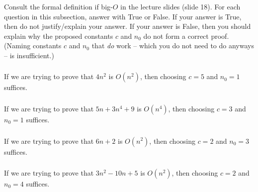 \documentclass{article}
\begin{document}
Consult the formal definition if big-$O$ in the lecture slides (slide 18). For each question in this subsection, answer with True or False. If your answer is True, then do not justify/explain your answer. If your answer is False, then you should explain why the proposed constants $c$ and $n_0$ do not form a correct proof. (Naming constants $c$ and $n_0$ that \textit{do} work -- which you do not need to do anyways -- is insufficient.)

\subsubsection{}

If we are trying to prove that $4n^2$ is $O(n^2)$, then choosing $c = 5$ and $n_0 = 1$ suffices.

\begin{mdframed}
\vspace{3em}
\end{mdframed}

\subsubsection{}

If we are trying to prove that $5n + 3n^4 + 9$ is $O(n^4)$, then choosing $c = 3$ and $n_0 = 1$ suffices.

\begin{mdframed}
\vspace{3em}
\end{mdframed}

\subsubsection{}

If we are trying to prove that $6n + 2$ is $O(n^2)$, then choosing $c = 2$ and $n_0 = 3$ suffices.

\begin{mdframed}
\vspace{3em}
\end{mdframed}

\subsubsection{}

If we are trying to prove that $3n^2 - 10n + 5$ is $O(n^2)$, then choosing $c = 2$ and $n_0 = 4$ suffices.

\begin{mdframed}
\vspace{3em}
\end{mdframed}
\end{document}

